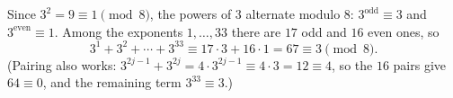 Since $3^2=9\equiv1\pmod8$, the powers of $3$ alternate modulo $8$: $3^{\text{odd}}\equiv3$ and $3^{\text{even}}\equiv1$. Among the exponents $1,\dots,33$ there are $17$ odd and $16$ even ones, so
\[
3^1+3^2+\cdots+3^{33}\equiv17\cdot3+16\cdot1=67\equiv\boxed{3}\pmod8 .
\]
(Pairing also works: $3^{2j-1}+3^{2j}=4\cdot3^{2j-1}\equiv4\cdot3=12\equiv4$, so the $16$ pairs give $64\equiv0$, and the remaining term $3^{33}\equiv3$.)

